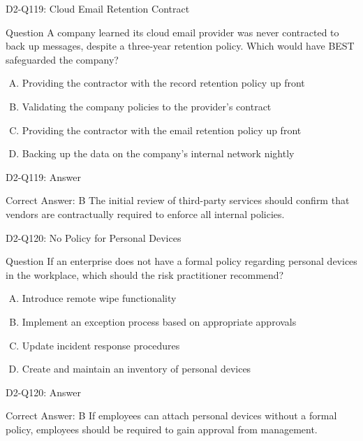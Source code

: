 \documentclass{beamer}
\begin{document}
	\begin{frame}{D2-Q119: Cloud Email Retention Contract}
		\begin{block}{Question}
			A company learned its cloud email provider was never contracted to back up messages, despite a three-year retention policy. Which would have BEST safeguarded the company?
		\end{block}
		\begin{enumerate}[(A)]
			\item Providing the contractor with the record retention policy up front
			\item Validating the company policies to the provider's contract
			\item Providing the contractor with the email retention policy up front
			\item Backing up the data on the company's internal network nightly
		\end{enumerate}
	\end{frame}
	\begin{frame}{D2-Q119: Answer}
		\begin{block}{Correct Answer: B}
			The initial review of third-party services should confirm that vendors are contractually required to enforce all internal policies.
		\end{block}
	\end{frame}
	
	\begin{frame}{D2-Q120: No Policy for Personal Devices}
		\begin{block}{Question}
			If an enterprise does not have a formal policy regarding personal devices in the workplace, which should the risk practitioner recommend?
		\end{block}
		\begin{enumerate}[(A)]
			\item Introduce remote wipe functionality
			\item Implement an exception process based on appropriate approvals
			\item Update incident response procedures
			\item Create and maintain an inventory of personal devices
		\end{enumerate}
	\end{frame}
	\begin{frame}{D2-Q120: Answer}
		\begin{block}{Correct Answer: B}
			If employees can attach personal devices without a formal policy, employees should be required to gain approval from management.
		\end{block}
	\end{frame}
	
\end{document}
